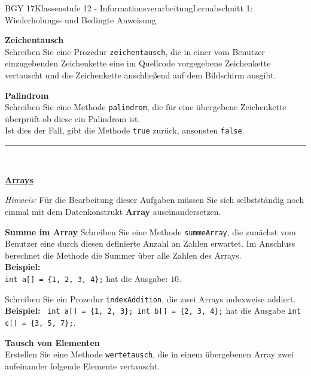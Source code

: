 \documentclass[oneside,openany,headings=optiontotoc,11pt,numbers=noenddot]{scrreprt}
\begin{document}
\begin{worksheet}{BGY 17}{Klassenstufe 12 - Informationsverarbeitung}{Lernabschnitt 1: Wiederholungs- und Bedingte Anweisung}
\begin{framed}
			\textbf{Zeichentausch}\\
			Schreiben Sie eine Prozedur \lstinline[style=JavaInputStyle]|zeichentausch|, die in einer vom Benutzer einzugebenden Zeichenkette eine im Quellcode vorgegebene Zeichenkette vertauscht und die Zeichenkette anschließend auf dem Bildschirm ausgibt.\\
			\par\noindent
			\textbf{Palindrom}\\
			Schreiben Sie eine Methode \lstinline[style=JavaInputStyle]|palindrom|, die für eine übergebene Zeichenkette überprüft ob diese ein Palindrom ist.\\
			Ist dies der Fall, gibt die Methode \lstinline[style=JavaInputStyle]|true| zurück, ansonsten \lstinline[style=JavaInputStyle]|false|.\\
			\par\noindent
			\rule{\textwidth}{0.1pt}\\
			\par\noindent
			\large{\textbf{\underline{Arrays}}}\\
			\normalsize
			\par\noindent
			\textit{Hinweis:} Für die Bearbeitung dieser Aufgaben müssen Sie sich selbstständig noch einmal mit dem Datenkonstrukt \textbf{Array} auseinandersetzen.\\
			\par\noindent
			\textbf{Summe im Array}
			Schreiben Sie eine Methode \lstinline[style=JavaInputStyle]|summeArray|, die zunächst vom Benutzer eine durch diesen definierte Anzahl an Zahlen erwartet. Im Anschluss berechnet die Methode die Summer über alle Zahlen des Arrays.\\
			\textbf{Beispiel:}\\
			\lstinline[style=JavaInputStyle]|int a[] = {1, 2, 3, 4};| hat die Ausgabe: \(10\).\\
			\par\noindent
			Schreiben Sie ein Prozedur \lstinline[style=JavaInputStyle]|indexAddition|, die zwei Arrays indexweise addiert.\\
			\textbf{Beispiel:}
			\lstinline[style=JavaInputStyle]| int a[] = {1, 2, 3}; int b[] = {2, 3, 4};| hat die Ausgabe \lstinline[style=JavaInputStyle]|int c[] = {3, 5, 7};|.\\
			\par\noindent
			\textbf{Tausch von Elementen}\\
			Erstellen Sie eine Methode \lstinline[style=JavaInputStyle]|wertetausch|, die in einem übergebenen Array zwei aufeinander folgende Elemente vertauscht.\\

\end{framed}
\end{worksheet}
\end{document}
